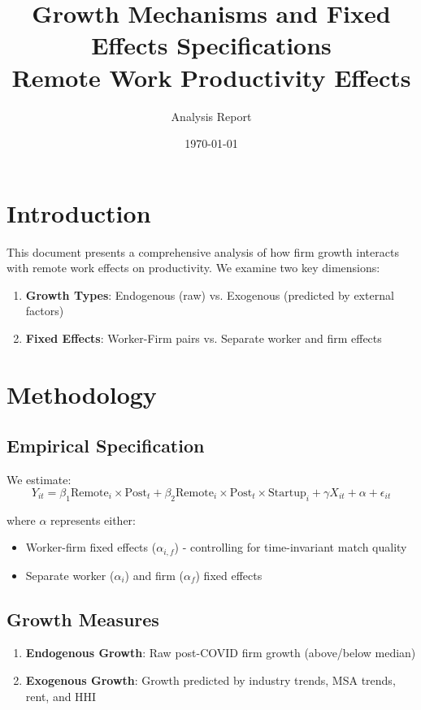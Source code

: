 \documentclass[11pt]{article}
\title{Growth Mechanisms and Fixed Effects Specifications\\
\large Remote Work Productivity Effects}
\author{Analysis Report}
\date{\today}
\begin{document}
\maketitle

\section{Introduction}

This document presents a comprehensive analysis of how firm growth interacts with remote work effects on productivity. We examine two key dimensions:
\begin{enumerate}
\item \textbf{Growth Types}: Endogenous (raw) vs. Exogenous (predicted by external factors)
\item \textbf{Fixed Effects}: Worker-Firm pairs vs. Separate worker and firm effects
\end{enumerate}

\section{Methodology}

\subsection{Empirical Specification}

We estimate:
\begin{equation}
Y_{it} = \beta_1 \text{Remote}_i \times \text{Post}_t + \beta_2 \text{Remote}_i \times \text{Post}_t \times \text{Startup}_i + \gamma X_{it} + \alpha + \epsilon_{it}
\end{equation}

where $\alpha$ represents either:
\begin{itemize}
\item Worker-firm fixed effects ($\alpha_{i,f}$) - controlling for time-invariant match quality
\item Separate worker ($\alpha_i$) and firm ($\alpha_f$) fixed effects
\end{itemize}

\subsection{Growth Measures}

\begin{enumerate}
\item \textbf{Endogenous Growth}: Raw post-COVID firm growth (above/below median)
\item \textbf{Exogenous Growth}: Growth predicted by industry trends, MSA trends, rent, and HHI
\end{enumerate}
\end{document}
